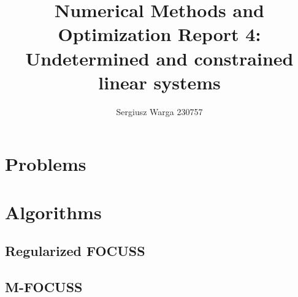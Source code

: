 \documentclass[a4paper]{article}
\title{Numerical Methods and Optimization Report 4:
Undetermined and constrained linear systems}
\author{Sergiusz Warga 230757}
\date{}
\begin{document}
\maketitle
\tableofcontents
\pagebreak

\section{Problems}





\clearpage

\section{Algorithms}
\subsection{Regularized FOCUSS}%
\label{algorithm:focuss}


\subsection{M-FOCUSS}%
\label{algorithm:mfocuss}



\clearpage

\nocite{Zdunek, GoluVanl96, Meyer, GorodRao97}


\end{document}
